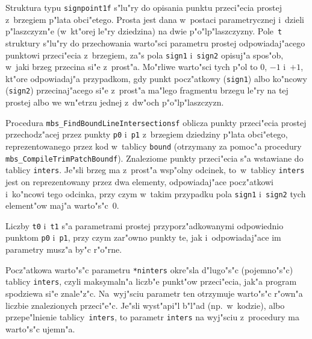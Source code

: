 \vspace{\bigskipamount}
Struktura typu \texttt{signpoint1f} s"lu"ry do opisania punktu przeci"ecia
prostej z~brzegiem p"lata obci"etego. Prosta jest dana w~postaci
parametrycznej i~dzieli p"laszczyzn"e (w~kt"orej le"ry dziedzina) na dwie
p"o"lp"laszczyzny. Pole~\texttt{t} struktury s"lu"ry do przechowania
warto"sci parametru prostej odpowiadaj"acego punktowi przeci"ecia
z~brzegiem, za"s pola \texttt{sign1} i~\texttt{sign2} opisuj"a spos"ob,
w~jaki brzeg przecina si"e z~prost"a. Mo"rliwe warto"sci tych p"ol to $0$,
$-1$ i~$+1$, kt"ore odpowiadaj"a przypadkom, gdy punkt pocz"atkowy
(\texttt{sign1}) albo ko"ncowy (\texttt{sign2}) przecinaj"acego si"e
z~prost"a ma"lego fragmentu brzegu le"ry na tej prostej albo we wn"etrzu
jednej z~dw"och p"o"lp"laszczyzn.

\vspace{\bigskipamount}
\begin{sloppypar}
Procedura \texttt{mbs\_FindBoundLineIntersectionsf} oblicza punkty
prze\-ci"e\-cia pros\-tej przechodz"acej przez punkty \texttt{p0} i~\texttt{p1}
z~brzegiem dziedziny p"lata obci"etego, reprezentowanego przez kod w~tablicy
\texttt{bound} (otrzymany za pomoc"a procedury
\texttt{mbs\_CompileTrimPatchBoundf}). Znaleziome punkty przeci"ecia s"a
wstawiane do tablicy \texttt{inters}. Je"sli brzeg ma z~prost"a wsp"olny
odcinek, to~w~tablicy \texttt{inters} jest on reprezentowany przez dwa elementy,
odpowiadaj"ace pocz"atkowi i~ko"ncowi tego odcinka, przy czym w~takim
przypadku pola \texttt{sign1} i~\texttt{sign2} tych element"ow maj"a
warto"s"c~$0$.
\end{sloppypar}

Liczby \texttt{t0} i~\texttt{t1} s"a parametrami prostej przyporz"adkowanymi
odpowiednio punktom \texttt{p0} i~\texttt{p1}, przy czym zar"owno punkty te,
jak i~odpowiadaj"ace im parametry musz"a by"c r"o"rne.

Pocz"atkowa warto"s"c parametru \texttt{*ninters} okre"sla d"lugo"s"c
(pojemno"s"c) tablicy \texttt{inters}, czyli maksymaln"a liczb"e punkt"ow
przeci"ecia, jak"a program spodziewa si"e znale"z"c. Na~wyj"sciu parametr
ten otrzymuje warto"s"c r"own"a liczbie znalezionych przeci"e"c. Je"sli
wyst"api"l b"l"ad (np.\ w~kodzie), albo przepe"lnienie
tablicy~\texttt{inters}, to parametr \texttt{inters} na wyj"sciu z~procedury
ma warto"s"c ujemn"a.

